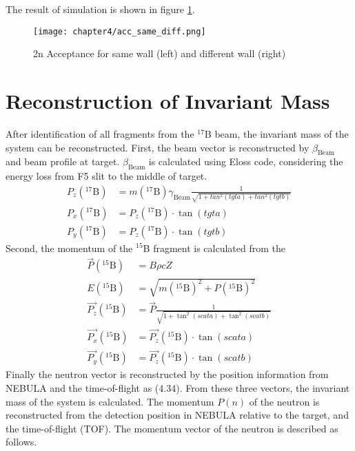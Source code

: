 The result of simulation is shown in figure \ref{fig:acc_same_diff}.
\begin{figure}
    \centering
    \texttt{[image: chapter4/acc\_same\_diff.png]}
    \caption[$2n$ Acceptance for $E_{rel}$ and $\theta_{scat}$]{2n Acceptance for same wall (left) and different wall (right)}
    \label{fig:acc_same_diff}
\end{figure}


\section{Reconstruction of Invariant Mass}
After identification of all fragments from the ${}^{17}$B beam, the invariant mass of the system can be reconstructed. First, the beam vector is reconstructed by $\beta_{\text{Beam}}$ and beam profile at target. $\beta_{\text{Beam}}$ is calculated using Eloss code, considering the energy loss from F5 slit to the middle of target.
\begin{align}
    P_z ({}^{17}\text{B}) &=  m({}^{17}\text{B}) \gamma_{\text{Beam}} \frac{1}{\sqrt{1+tan^2(tgta)+tan^2(tgtb)}}\\
    P_x ({}^{17}\text{B}) &=  P_z ({}^{17}\text{B}) \cdot \tan(tgta)\\ 
    P_y ({}^{17}\text{B}) &=  P_z ({}^{17}\text{B}) \cdot \tan(tgtb)
\end{align}
Second, the momentum of the ${}^{15}$B fragment is calculated from the 
\begin{align}
    \vec{P} ({}^{15}\text{B}) &= B\rho c Z \\
    E ({}^{15}\text{B}) &= \sqrt{m({}^{15}\text{B})^{2} + P({}^{15}\text{B})^{2}}\\
    \vec{P_z} ({}^{15}\text{B}) &= \vec{P} \frac{1}{\sqrt{1 + \tan^2(scata)+ \tan^2(scatb)}}\\
    \vec{P_x} ({}^{15}\text{B}) &= \vec{P_z} ({}^{15}\text{B}) \cdot \tan(scata)\\
    \vec{P_y} ({}^{15}\text{B}) &= \vec{P_z} ({}^{15}\text{B}) \cdot \tan(scatb)
\end{align}
Finally the neutron vector is reconstructed by the position information from NEBULA and the time-of-flight as (4.34). From these three vectors, the invariant mass of the system is calculated.
The momentum $P(n)$ of the neutron is reconstructed from the detection position in NEBULA relative to the target, and the time-of-flight (TOF). The momentum vector of the neutron is described as follows.

